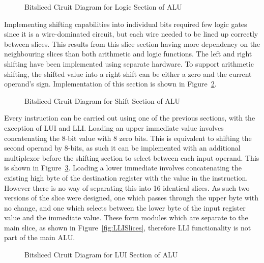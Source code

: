 \begin{figure}[h]
	\caption{Bitsliced Ciruit Diagram for Logic Section of ALU}
	\label{fig:LogicSlice}
\end{figure}

Implementing shifting capabilities into individual bits required few logic gates since it is a wire-dominated circuit, but each wire needed to be lined up correctly between slices. 
This results from this slice section having more dependency on the neighbouring slices than both arithmetic and logic functions. 
The left and right shifting have been implemented using separate hardware. 
To support arithmetic shifting, the shifted value into a right shift can be either a zero and the current operand's sign.
Implementation of this section is shown in Figure~\ref{fig:ShiftSlice}. 

\begin{figure}[h]
	\caption{Bitsliced Ciruit Diagram for Shift Section of ALU}
	\label{fig:ShiftSlice}
\end{figure}

Every instruction can be carried out using one of the previous sections, with the exception of LUI and LLI. Loading an upper immediate value involves concatenating the 8-bit value with 8 zero bits. 
This is equivalent to shifting the second operand by 8-bits, as such it can be implemented with an additional multiplexor before the shifting section to select between each input operand. 
This is shown in Figure~\ref{fig:LUISlice}. 
Loading a lower immediate involves concatenating the existing high byte of the destination register with the value in the instruction. 
However there is no way of separating this into 16 identical slices. 
As such two versions of the slice were designed, one which passes through the upper byte with no change, and one which selects between the lower byte of the input register value and the immediate value. 
These form modules which are separate to the main slice, as shown in Figure~\ref{fig:LLISlices}, therefore LLI functionality is not part of the main ALU. 

\begin{figure}[h]
	\caption{Bitsliced Ciruit Diagram for LUI Section of ALU}
	\label{fig:LUISlice}
\end{figure}

